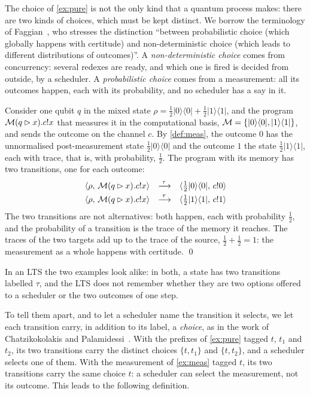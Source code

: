 The choice of \cref{ex:pure} is not the only kind that a quantum process
makes: there are two kinds of choices, which must be kept distinct. We
borrow the terminology of Faggian~\cite{Faggian22}, who stresses the
distinction ``between probabilistic choice (which globally happens with
certitude) and non-deterministic choice (which leads to different
distributions of outcomes)''. A \emph{non-deterministic choice} comes from
concurrency: several redexes are ready, and which one is fired is decided
from outside, by a scheduler. A \emph{probabilistic choice} comes from a
measurement: all its outcomes happen, each with its probability, and no
scheduler has a say in it.

\begin{example}\label{ex:meas}
Consider one qubit $q$ in the mixed state
$\rho = \frac{1}{2}|0\rangle\langle 0| + \frac{1}{2}|1\rangle\langle 1|$, and
the program $\mathcal{M}(q \rhd x).c!x$ that measures it in the computational basis,
$\mathcal{M} = \{|0\rangle\langle 0|, |1\rangle\langle 1|\}$, and sends the outcome on
the channel $c$. By \cref{def:meas}, the outcome $0$ has the unnormalised
post-measurement state $\frac{1}{2}|0\rangle\langle 0|$ and the outcome $1$
the state $\frac{1}{2}|1\rangle\langle 1|$, each with trace, that is, with
probability, $\frac{1}{2}$. The program with its memory has two transitions,
one for each outcome:
\[
\begin{array}{rcl}
\langle \rho ,\, \mathcal{M}(q \rhd x).c!x \rangle &\xrightarrow{\;\tau\;}& \langle \frac{1}{2}|0\rangle\langle 0| ,\, c!0 \rangle\\[3pt]
\langle \rho ,\, \mathcal{M}(q \rhd x).c!x \rangle &\xrightarrow{\;\tau\;}& \langle \frac{1}{2}|1\rangle\langle 1| ,\, c!1 \rangle
\end{array}
\]
The two transitions are not alternatives: both happen, each with
probability $\frac{1}{2}$, and the probability of a transition is the trace
of the memory it reaches. The traces of the two targets add up to the trace
of the source, $\frac{1}{2} + \frac{1}{2} = 1$: the measurement as a whole
happens with certitude.
\qed
\end{example}

In an LTS the two examples look alike: in both, a state has two transitions
labelled $\tau$, and the LTS does not remember whether they are two options
offered to a scheduler or the two outcomes of one step.

To tell them apart, and to let a scheduler name the transition it selects,
we let each transition carry, in addition to its label, a \emph{choice}, as
in the work of Chatzikokolakis and Palamidessi~\cite{CP10}. With the prefixes of \cref{ex:pure} tagged $t$, $t_1$ and
$t_2$, its two transitions carry the distinct choices $\{t,t_1\}$ and
$\{t,t_2\}$, and a scheduler selects one of them. With the measurement of
\cref{ex:meas} tagged $t$, its two transitions carry the same choice $t$: a
scheduler can select the measurement, not its outcome. This leads to the
following definition.

